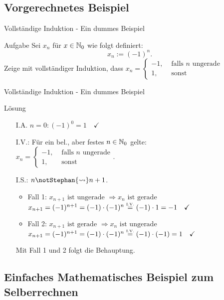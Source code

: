 \subsection{Vorgerechnetes Beispiel}
\begin{frame}{Vollständige Induktion - Ein dummes Beispiel}
	\begin{exampleblock}{Aufgabe}
		Sei $x_n$ für $x \in \mathbb{N}_0$ wie folgt definiert:
		\[
			x_n := (-1)^n.
		\]
		Zeige mit vollständiger Induktion, dass 
		$x_n = 
		\begin{cases}
			-1, &\text{ falls $n$ ungerade}\\
			1, &\text{ sonst}
		\end{cases}$
	\end{exampleblock}
\end{frame}
\begin{frame}{Vollständige Induktion - Ein dummes Beispiel}
	\begin{block}{Lösung}
		\begin{itemize}
			\item[I.A.] $n=0: (-1)^0=1 \quad \checkmark$
			\item[I.V.:] Für ein bel., aber festes $n \in \mathbb{N}_0$ gelte: \\
				 			$x_n = 
					\begin{cases}
						-1, &\text{ falls $n$ ungerade}\\
						1, &\text{ sonst}
					\end{cases}.$
			\item[I.S.:] $n \notStephan{\leadsto} \Stephan{\curvearrowright} n+1$.\\
			\begin{itemize}
				\item Fall 1: $x_{n+1} \text{ ist ungerade } \Rightarrow x_n \text{ ist gerade}$\\
					$x_{n+1} = (-1)^{n+1} = (-1) \cdot (-1)^n \eqtext{I.V.} (-1) \cdot 1 = -1 \quad \checkmark$
				\item Fall 2: $x_{n+1} \text{ ist gerade } \Rightarrow x_n \text{ ist ungerade}$\\
					$x_{n+1} = (-1)^{n+1} = (-1) \cdot (-1)^n \eqtext{I.V.} (-1) \cdot (-1) = 1 \quad \checkmark$
			\end{itemize}
			Mit Fall 1 und 2 folgt die Behauptung. \qedwhite{}
		\end{itemize}
	\end{block}
\end{frame}
\subsection{Einfaches Mathematisches Beispiel zum Selberrechnen}


